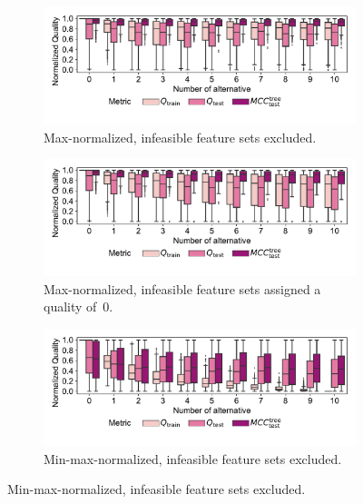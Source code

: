 \documentclass{article}
\theoremstyle{definition}
\begin{document}
\begin{figure}[p]
	\centering
	\begin{subfigure}[t]{\textwidth}
		\centering
		\includegraphics[width=\textwidth, trim=14 33 14 16, clip]{plots/afs-impact-num-alternatives-quality-max.pdf}
		\caption{Max-normalized, infeasible feature sets excluded.}
		\label{fig:afs:impact-num-alternatives-quality-max}
	\end{subfigure}
	\begin{subfigure}[t]{\textwidth}
		\centering
		\includegraphics[width=\textwidth, trim=14 33 14 16, clip]{plots/afs-impact-num-alternatives-quality-max-fillna.pdf}
		\caption{Max-normalized, infeasible feature sets assigned a quality of~0.}
		\label{fig:afs:impact-num-alternatives-quality-max-fillna}
	\end{subfigure}
	\begin{subfigure}[t]{\textwidth}
		\centering
		\includegraphics[width=\textwidth, trim=14 33 14 16, clip]{plots/afs-impact-num-alternatives-quality-min-max.pdf}
		\caption{Min-max-normalized, infeasible feature sets excluded.}

\end{subfigure}
\end{figure}
\end{document}
